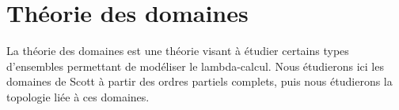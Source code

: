 \part{Théorie des domaines}

La théorie des domaines est une théorie visant à étudier certains types d'ensembles permettant de modéliser le lambda-calcul. Nous étudierons ici les domaines de Scott à partir des ordres partiels complets, puis nous étudierons la topologie liée à ces domaines.




